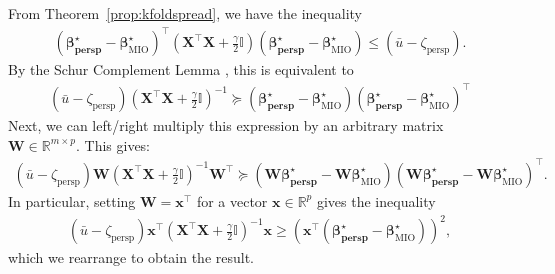 \documentclass[mnsc,nonblindrev]{informs3} %
\newcommand{\ag}[1]{{\color{black}#1}}
\begin{document}
From Theorem~\ref{prop:kfoldspread}, we have the inequality
\begin{align}
(\bm{\beta^\star_{\text{persp}}}- \bm{\beta}^\star_{\text{MIO}})^\top \left(\bm{X}^\top \bm{X}+\frac{\gamma}{2} \bm{\mathbb{I}}\right) (\bm{\beta^\star_{\text{persp}}}- \bm{\beta}^\star_{\text{MIO}}) \leq (\bar{u}-\zeta_{\text{persp}}).
	\end{align}
 By the Schur Complement Lemma \citep[see, e.g.,][]{boyd1994linear}, this is equivalent to
 \begin{align*}
     (\bar{u}-\zeta_{\text{persp}}) \left(\bm{X}^\top \bm{X}+\frac{\gamma}{2} \bm{\mathbb{I}}\right)^{-1}\succeq (\bm{\beta^\star_{\text{persp}}}- \bm{\beta}^\star_{\text{MIO}})(\bm{\beta^\star_{\text{persp}}}- \bm{\beta}^\star_{\text{MIO}})^\top
 \end{align*}
 Next, we can left/right multiply this expression by an arbitrary matrix $\bm{W} \in \mathbb{R}^{m \times p}$. This gives:
 \begin{align*}
     (\bar{u}-\zeta_{\text{persp}}) \bm{W}\left(\bm{X}^\top \bm{X}+\frac{\gamma}{2} \bm{\mathbb{I}}\right)^{-1}\bm{W}^\top\succeq (\bm{W}\bm{\beta^\star_{\text{persp}}}- \bm{W}\bm{\beta}^\star_{\text{MIO}})(\bm{W}\bm{\beta^\star_{\text{persp}}}- \bm{W}\bm{\beta}^\star_{\text{MIO}})^\top.
 \end{align*}
In particular, setting $\bm{W}=\bm{x}^\top$ for a vector $\bm{x} \in \mathbb{R}^{p}$ gives the inequality
 \begin{align*}
     (\bar{u}-\zeta_{\text{persp}}) \bm{x}^\top \left(\bm{X}^\top \bm{X}+\frac{\gamma}{2} \bm{\mathbb{I}}\right)^{-1} \bm{x}\geq (\bm{x}^\top(\bm{\beta^\star_{\text{persp}}}- \bm{\beta}^\star_{\text{MIO}}))^2,
 \end{align*}
 which we rearrange to obtain the result.
\Halmos
	
\endproof
\end{document}

